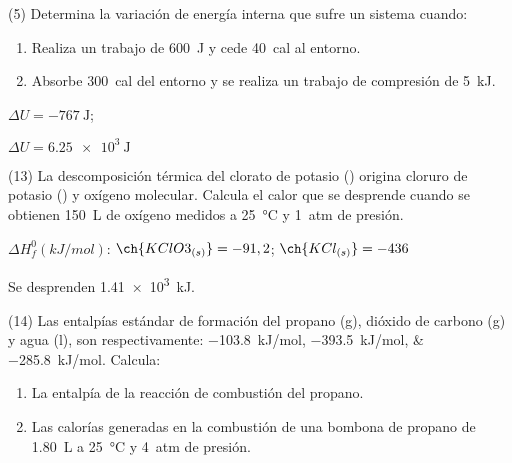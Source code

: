 \documentclass[10pt]{article}
\newenvironment{gexdatos}{
    \noindent\makebox[0pt][r]{\textit{Datos:}}
}{\vspace{5pt}}
\begin{document}
\begin{multicols}{2}



\begin{exercise}
  (5) Determina la variación de energía interna que sufre un sistema
  cuando:
  \begin{enumerate}
    \item Realiza un trabajo de \SI{600}{\joule} y cede \SI{40}{cal} al entorno.
    \item Absorbe \SI{300}{cal} del entorno y se realiza un trabajo de compresión de \SI{5}{\kilo\joule}.
  \end{enumerate}
\end{exercise}

\begin{solution}
  \begin{enumerate*}
    \item \( \Delta U = \SI{-767}{\joule} \); \item \( \Delta U = \SI{6.25e3}{\joule} \)
  \end{enumerate*}
\end{solution}

\begin{exercise}
  (13) La descomposición térmica del clorato de potasio ()
  origina cloruro de potasio () y oxígeno molecular. Calcula
  el calor que se desprende cuando se obtienen \SI{150}{\liter} de
  oxígeno medidos a \SI{25}{\celsius} y \SI{1}{atm} de presión.

  \begin{gexdatos}
    \( \Delta H^0_f (\si{kJ/mol}) \): \( \ch{KClO3_{(s)}} = -91,2 \); \( \ch{KCl_{(s)}} = -436 \)
  \end{gexdatos}
\end{exercise}

\begin{solution}
  Se desprenden \SI{1.41e3}{kJ}.
\end{solution}

\begin{exercise}
  (14) Las entalpías estándar de formación del propano (g),
  dióxido de carbono (g) y agua (l), son respectivamente:
  \SIlist{-103,8;-393,5;-285,8}{kJ/mol}. Calcula:
  \begin{enumerate}
    \item La entalpía de la reacción de combustión del propano.
    \item Las calorías generadas en la combustión de una bombona de propano de \SI{1.80}{\liter} a \SI{25}{\celsius} y \SI{4}{atm} de presión.
  \end{enumerate}
\end{exercise}


\end{multicols}
\end{document}
